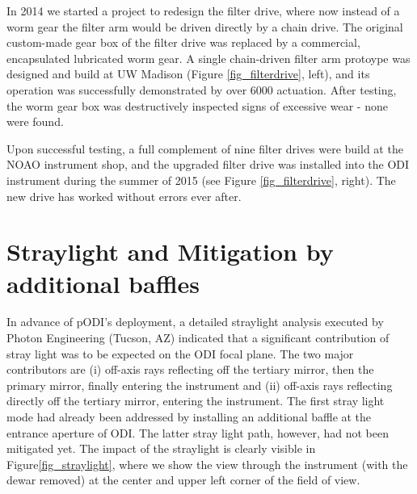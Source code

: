 \documentclass[]{spieman}
\begin{document}
In 2014 we  started a project to redesign the filter drive, where now 
instead of a worm gear the filter arm would be driven directly by a chain 
drive. The original custom-made gear box of the filter drive was replaced by a commercial, 
encapsulated lubricated worm gear. A single chain-driven filter arm protoype was designed and build
at UW Madison (Figure \ref{fig_filterdrive}, left), and its operation was  successfully demonstrated 
by  over 6000 actuation. After testing, the worm gear box was destructively inspected signs of 
excessive wear - none  were found. 

Upon successful testing, a full complement of nine filter drives were build at 
the NOAO instrument shop, and the upgraded filter drive was installed into the 
ODI instrument during the summer of 2015 (see Figure \ref{fig_filterdrive}, 
right). The new drive has worked without  errors ever after. 



\section{Straylight and Mitigation by additional baffles}

In advance of pODI's  deployment, a detailed straylight analysis executed by
Photon Engineering (Tucson, AZ) indicated that a significant contribution of 
stray light was to be expected on the ODI focal plane. The two major
contributors are (i) off-axis rays reflecting off the tertiary mirror, then the
primary mirror, finally entering the instrument and (ii) off-axis rays
reflecting directly off the tertiary mirror, entering the instrument. The first
stray light mode had already been addressed by installing an additional baffle
at the entrance aperture of ODI. The latter stray light path, however, had not
been mitigated yet. The impact of the straylight is clearly visible in
Figure\ref{fig_straylight}, where we show the view through the instrument (with
the dewar removed) at the center and upper left corner of the field of view.
\end{document}
